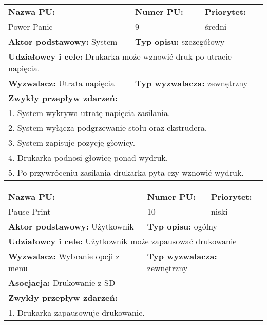\documentclass{article}
\begin{document}
\begin{enumerate}[label=\arabic*.]
\newpage
\begin{tabular}{|p{5cm}|p{3cm}|p{3cm}|p{3cm}|p{}|p{3cm}|}
\hline
\multicolumn{4}{|l|}{\textbf{Nazwa PU:}} & \multicolumn{1}{l|}{\textbf{Numer PU:}} & \multicolumn{1}{|l|}{\textbf{Priorytet:} } \\ 
\multicolumn{4}{|l|}{Power Panic} & \multicolumn{1}{l|}{9} & \multicolumn{1}{|l|}{średni}\\ \hline
\multicolumn{3}{|l|}{\textbf{Aktor podstawowy:} System} & \multicolumn{3}{l|}{\textbf{Typ opisu:} szczegółowy} \\ \hline
\multicolumn{6}{|l|}{\textbf{Udziałowcy i cele:} Drukarka może wznowić druk po utracie napięcia.} \\ \hline
\multicolumn{3}{|l|}{\textbf{Wyzwalacz:} Utrata napięcia} & \multicolumn{3}{l|}{\textbf{Typ wyzwalacza:} zewnętrzny} \\ 
\hline
\multicolumn{6}{|l|}{\textbf{Zwykły przepływ zdarzeń:}} \\
\multicolumn{6}{|l|}{1. System wykrywa utratę napięcia zasilania.} \\
\multicolumn{6}{|l|}{2. System wyłącza podgrzewanie stołu oraz ekstrudera.} \\
\multicolumn{6}{|l|}{3. System zapisuje pozycję głowicy.} \\
\multicolumn{6}{|l|}{4. Drukarka podnosi głowicę ponad wydruk.} \\
\multicolumn{6}{|l|}{5. Po przywróceniu zasilania drukarka pyta czy wznowić wydruk.} \\
\hline
\end{tabular}

\newpage
\begin{tabular}{|p{5cm}|p{3cm}|p{3cm}|p{3cm}|p{}|p{3cm}|}
\hline
\multicolumn{4}{|l|}{\textbf{Nazwa PU:}} & \multicolumn{1}{l|}{\textbf{Numer PU:}} & \multicolumn{1}{|l|}{\textbf{Priorytet:} } \\ 
\multicolumn{4}{|l|}{Pause Print} & \multicolumn{1}{l|}{10} & \multicolumn{1}{|l|}{niski}\\ \hline
\multicolumn{3}{|l|}{\textbf{Aktor podstawowy:} Użytkownik} & \multicolumn{3}{l|}{\textbf{Typ opisu:} ogólny} \\ \hline
\multicolumn{6}{|l|}{\textbf{Udziałowcy i cele:} Użytkownik może zapausować drukowanie} \\ \hline
\multicolumn{3}{|l|}{\textbf{Wyzwalacz:} Wybranie opcji z menu} & \multicolumn{3}{l|}{\textbf{Typ wyzwalacza:} zewnętrzny} \\ 
\hline
\multicolumn{6}{|l|}{\textbf{Asocjacja:} Drukowanie z SD} \\ \hline
\multicolumn{6}{|l|}{\textbf{Zwykły przepływ zdarzeń:}} \\
\multicolumn{6}{|l|}{1. Drukarka zapausowuje drukowanie.} \\
\hline
\end{tabular}


\end{enumerate}
\end{document}
